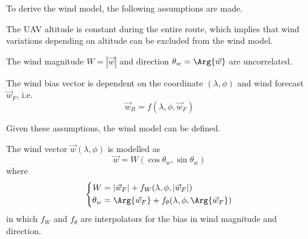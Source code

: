 To derive the wind model, the following assumptions are made.

\begin{assumption}
The UAV altitude is constant during the entire route, which implies that wind variations depending on altitude can be excluded from the wind model.
\end{assumption}

\begin{assumption}
The wind magnitude $W=|\vec{w}|$ and direction $\theta_w=\Arg{\vec{w}}$ are uncorrelated.
\end{assumption}

\begin{assumption}
The wind bias vector is dependent on the coordinate $(\lambda,\phi)$ and wind forecast $\vec{w}_F$, i.e.
\begin{equation}
    \vec{w}_B=f(\lambda,\phi,\vec{w}_F)
\end{equation}
\end{assumption}

Given these assumptions, the wind model can be defined.

\begin{definition}
    The wind vector $\vec{w}(\lambda,\phi)$ is modelled as
    \begin{equation}
        \vec{w}=W(\cos\theta_w,\sin\theta_w)
    \end{equation}
    where
    \begin{equation}
        \left\{
        \begin{aligned}
            W &= |\vec{w}_F| + f_W(\lambda,\phi,|\vec{w}_F|) \\
            \theta_w &= \Arg{\vec{w}_F} + f_\theta(\lambda,\phi,\Arg{\vec{w}_F}) 
        \end{aligned}
        \right.
    \end{equation}
    in which $f_W$ and $f_\theta$ are \abbrTPS interpolators for the bias in wind magnitude and direction.
\end{definition}

